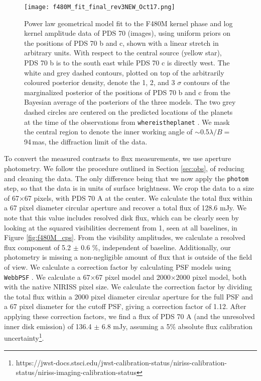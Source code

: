 \documentclass[11pt,twocolumn,twocolappendix]{aastex631}
\begin{document}




\begin{figure}
\centering
\texttt{[image: f480M\_fit\_final\_rev3NEW\_Oct17.png]}
\caption{{Power law} geometrical model fit to the F480M {kernel phase and log kernel amplitude}
data of PDS 70 (images), using uniform priors on the positions of PDS 70 b and c,{ shown with a linear stretch in arbitrary units}. {With respect to the central source (yellow star), PDS 70 b is to the south east while PDS 70 c is directly west.}
The {white and grey dashed contours, plotted on top of the arbitrarily coloured posterior density,} denote the 1, 2, and 3 $\sigma$ contours of the marginalized posterior of the positions of PDS 70 b and c {from the Bayesian average of the posteriors of the three models}. The two grey dashed circles are centered on the predicted locations of 
the planets
at the time of the observations \citep{2021AJ....161..148W} from \texttt{whereistheplanet} \citep{2021ascl.soft01003W}. We mask the central region to denote the inner working angle of $\sim$0.5$\lambda/B =$ 94\,mas, the diffraction limit of the data.}
\label{fig:f480M_fit}
\end{figure}

{To convert the measured contrasts to flux measurements, we use aperture photometry. We follow the procedure outlined in Section \ref{sec:obs}, of reducing and cleaning the data. The only difference being that we now apply the \texttt{photom} step, so that the data is in units of surface brightness. We crop the data to a size of 67$\times$67 pixels, with PDS 70 A at the center. We calculate the total flux within a 67 pixel diameter circular aperture and recover a total flux of 128.6 mJy. We note that this value includes resolved disk flux, which can be clearly seen by looking at the squared visibilities decrement from 1, seen at all baselines, in Figure \ref{fig:f480M_cps}. From the visibility amplitudes, we calculate a resolved flux component of 5.2 $\pm$ 0.6 \%, independent of baseline. Additionally, our photometry is missing a non-negligible amount of flux that is outside of the field of view. We calculate a correction factor by calculating PSF models using \texttt{WebbPSF} \citep{2012SPIE.8442E..3DP}. We calculate a 67$\times$67 pixel model and 2000$\times$2000 pixel model, both with the native NIRISS pixel size. We calculate the correction factor by dividing the total flux within a 2000 pixel diameter circular aperture for the full PSF and a 67 pixel diameter for the cutoff PSF, giving a correction factor of 1.12. After applying these correction factors, we find a flux of PDS 70 A (and the unresolved inner disk emission) of 136.4 $\pm$ 6.8 mJy, assuming a 5\% absolute flux calibration uncertainty\footnote{https://jwst-docs.stsci.edu/jwst-calibration-status/niriss-calibration-status/niriss-imaging-calibration-status}.}
\end{document}

